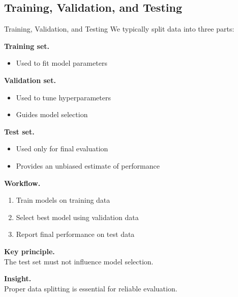 \documentclass[aspectratio=169,11pt]{beamer}
\begin{document}
\subsection{Training, Validation, and Testing}
\begin{frame}[t,allowframebreaks]{Training, Validation, and Testing}
\small
We typically split data into three parts:

\textbf{Training set.}\\ \begin{itemize}
    \item Used to fit model parameters
\end{itemize}

\textbf{Validation set.}\\ \begin{itemize}
    \item Used to tune hyperparameters
    \item Guides model selection
\end{itemize}

\textbf{Test set.}\\ \begin{itemize}
    \item Used only for final evaluation
    \item Provides an unbiased estimate of performance
\end{itemize}

\textbf{Workflow.}\\ \begin{enumerate}
    \item Train models on training data
    \item Select best model using validation data
    \item Report final performance on test data
\end{enumerate}

\textbf{Key principle.}\\ The test set must not influence model selection.

\textbf{Insight.}\\ Proper data splitting is essential for reliable evaluation.
\end{frame}
\end{document}
